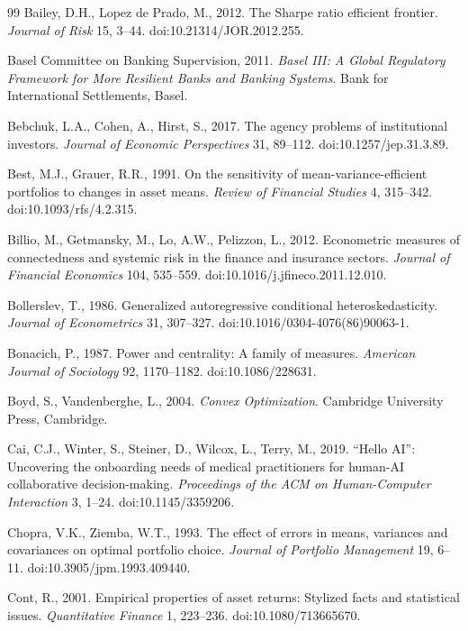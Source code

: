 \documentclass[11pt]{article}
\begin{document}
\begin{thebibliography}{99}
Bailey, D.H., Lopez de Prado, M., 2012. The Sharpe ratio efficient frontier. \textit{Journal of Risk} 15, 3--44. doi:10.21314/JOR.2012.255.

Basel Committee on Banking Supervision, 2011. \textit{Basel III: A Global Regulatory Framework for More Resilient Banks and Banking Systems}. Bank for International Settlements, Basel.

Bebchuk, L.A., Cohen, A., Hirst, S., 2017. The agency problems of institutional investors. \textit{Journal of Economic Perspectives} 31, 89--112. doi:10.1257/jep.31.3.89.

Best, M.J., Grauer, R.R., 1991. On the sensitivity of mean-variance-efficient portfolios to changes in asset means. \textit{Review of Financial Studies} 4, 315--342. doi:10.1093/rfs/4.2.315.

Billio, M., Getmansky, M., Lo, A.W., Pelizzon, L., 2012. Econometric measures of connectedness and systemic risk in the finance and insurance sectors. \textit{Journal of Financial Economics} 104, 535--559. doi:10.1016/j.jfineco.2011.12.010.

Bollerslev, T., 1986. Generalized autoregressive conditional heteroskedasticity. \textit{Journal of Econometrics} 31, 307--327. doi:10.1016/0304-4076(86)90063-1.

Bonacich, P., 1987. Power and centrality: A family of measures. \textit{American Journal of Sociology} 92, 1170--1182. doi:10.1086/228631.

Boyd, S., Vandenberghe, L., 2004. \textit{Convex Optimization}. Cambridge University Press, Cambridge.

Cai, C.J., Winter, S., Steiner, D., Wilcox, L., Terry, M., 2019. ``Hello AI'': Uncovering the onboarding needs of medical practitioners for human-AI collaborative decision-making. \textit{Proceedings of the ACM on Human-Computer Interaction} 3, 1--24. doi:10.1145/3359206.

Chopra, V.K., Ziemba, W.T., 1993. The effect of errors in means, variances and covariances on optimal portfolio choice. \textit{Journal of Portfolio Management} 19, 6--11. doi:10.3905/jpm.1993.409440.

Cont, R., 2001. Empirical properties of asset returns: Stylized facts and statistical issues. \textit{Quantitative Finance} 1, 223--236. doi:10.1080/713665670.


\end{thebibliography}
\end{document}
